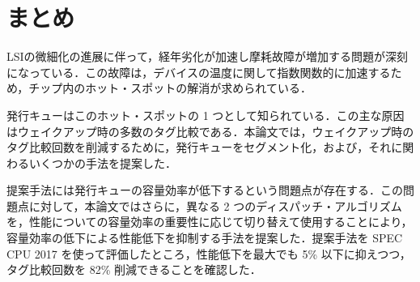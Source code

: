 
\chapter{まとめ}
\label{sec:summary}
LSIの微細化の進展に伴って，経年劣化が加速し摩耗故障が増加する問題が深刻になっている．この故障は，デバイスの温度に関して指数関数的に加速するため，チップ内のホット・スポットの解消が求められている．

発行キューはこのホット・スポットの 1 つとして知られている．この主な原因はウェイクアップ時の多数のタグ比較である．本論文では，ウェイクアップ時のタグ比較回数を削減するために，発行キューをセグメント化，および，それに関わるいくつかの手法を提案した．

提案手法には発行キューの容量効率が低下するという問題点が存在する．この問題点に対して，本論文ではさらに，異なる 2 つのディスパッチ・アルゴリズムを，性能についての容量効率の重要性に応じて切り替えて使用することにより，容量効率の低下による性能低下を抑制する手法を提案した．提案手法を SPEC CPU 2017 を使って評価したところ，性能低下を最大でも 5\% 以下に抑えつつ，タグ比較回数を 82\% 削減できることを確認した．
